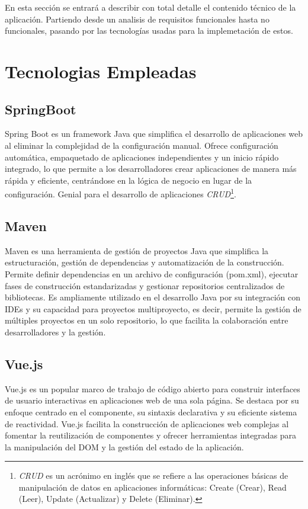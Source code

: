 En esta sección se entrará a describir con total detalle el contenido técnico de la aplicación. Partiendo desde un analisis de requisitos funcionales
hasta no funcionales, pasando por las tecnologías usadas para la implemetación de estos. 

\section{Tecnologias Empleadas}

\subsection{SpringBoot}
Spring Boot\cite{spring-boot} es un framework Java que simplifica el desarrollo de aplicaciones web al eliminar la 
complejidad de la configuración manual. Ofrece configuración automática, empaquetado de aplicaciones independientes y un inicio rápido integrado, 
lo que permite a los desarrolladores crear aplicaciones de manera más rápida y eficiente, centrándose en la lógica de negocio en lugar de la configuración. 
Genial para el desarrollo de aplicaciones \textit{CRUD}\footnote{\textit{CRUD} es un acrónimo en inglés que se refiere a las operaciones 
básicas de manipulación de datos en aplicaciones informáticas: Create (Crear), Read (Leer), Update (Actualizar) y Delete (Eliminar).}.
\subsection{Maven}
Maven es una herramienta de gestión de proyectos Java que simplifica la estructuración, gestión de dependencias y automatización de la construcción. 
Permite definir dependencias en un archivo de configuración (pom.xml), ejecutar fases de construcción estandarizadas y gestionar repositorios 
centralizados de bibliotecas. Es ampliamente utilizado en el desarrollo Java por su integración con IDEs y su capacidad para proyectos multiproyecto, es decir,
permite la gestión de múltiples proyectos en un solo repositorio, lo que facilita la colaboración entre desarrolladores y la gestión.
\subsection{Vue.js}
Vue.js\cite{vue} es un popular marco de trabajo de código abierto para construir interfaces de usuario interactivas en aplicaciones web de una sola página. 
Se destaca por su enfoque centrado en el componente, su sintaxis declarativa y su eficiente sistema de reactividad. Vue.js facilita la construcción 
de aplicaciones web complejas al fomentar la reutilización de componentes y ofrecer herramientas integradas para la manipulación del DOM y la gestión 
del estado de la aplicación.

